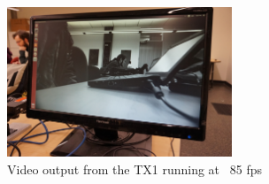 \begin{figure}[!ht]
\centering
\includegraphics[width=0.6\textwidth]{images/exampleOutputNormalBeta.jpg}
\caption{Video output from the TX1 running at ~85 fps}
\end{figure}